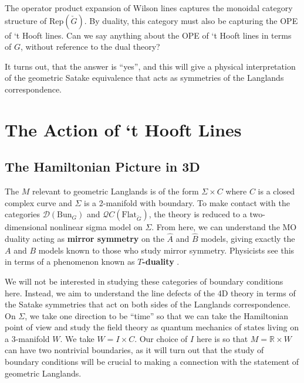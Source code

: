 		The operator product expansion of Wilson lines captures the monoidal category structure of $\mathrm{Rep}(\check G)$. By duality, this category must also be capturing the OPE of `t Hooft lines. Can we say anything about the OPE of `t Hooft lines in terms of $G$, without reference to the dual theory?
		
		It turns out, that the answer is ``yes'', and this will give a physical interpretation of the geometric Satake equivalence that acts as symmetries of the Langlands correspondence.



	\section{The Action of `t Hooft Lines} %
	\label{sec:the_action_of_t_hooft_lines}
	
	\subsection{The Hamiltonian Picture in 3D} %
	\label{sub:the_hamiltonian_picture_in_3d}
	
	The $M$ relevant to geometric Langlands is of the form  $\Sigma \times C$ where $C$ is a closed complex curve and $\Sigma$ is a 2-manifold with boundary. To make contact with the categories $\mathcal D(\mathrm{Bun}_G)$ and $\mathcal QC(\mathrm{Flat}_{\check G})$, the theory is reduced to a two-dimensional nonlinear sigma model on $\Sigma$. From here, we can understand the MO duality acting as \textbf{mirror symmetry} on the $\hat A$ and $\hat B$ models, giving exactly the $A$ and $B$ models known to those who study mirror symmetry. Physicists see this in terms of a phenomenon known as \textbf{$T$-duality} \cite{strominger1996}. 
	
	We will not be interested in studying these categories of boundary conditions here. Instead, we aim to understand the line defects of the 4D theory in terms of the Satake symmetries that act on both sides of the Langlands correspondence. On $\Sigma$, we take one direction to be ``time'' so that we can take the Hamiltonian point of view and study the field theory as quantum mechanics of states living on a 3-manifold $W$. We take $W = I \times C$. Our choice of $I$ here is so that $M = \mathbb R \times W$ can have two nontrivial boundaries, as it will turn out that the study of boundary conditions will be crucial to making a connection with the statement of geometric Langlands.
	
